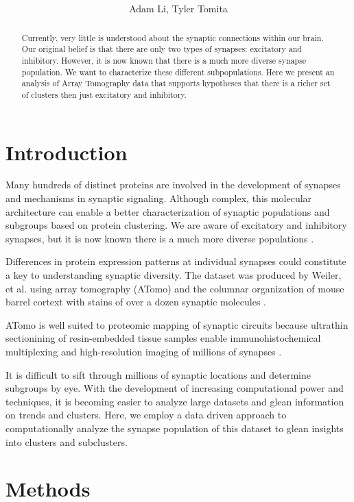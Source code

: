 \documentclass{article}
\title{\vspace{-50pt}
\db{Computational Analyses Supporting Diverse Synaptic Clusters}
}
\author{Adam Li, Tyler Tomita}
\begin{document}
\maketitle

\begin{abstract}
Currently, very little is understood about the synaptic connections within our brain. Our original belief is that there are only two types of synapses: excitatory and inhibitory. However, it is now known that there is a much more diverse synapse population. We want to characterize these different subpopulations. Here we present an analysis of Array Tomography data that supports hypotheses that there is a richer set of clusters then just excitatory and inhibitory. 
\end{abstract}

\section{Introduction}
Many hundreds of distinct proteins are involved in the development of synapses and mechanisms in synaptic signaling. Although complex, this molecular architecture can enable a better characterization of synaptic populations and subgroups based on protein clustering. We are aware of excitatory and inhibitory synapses, but it is now known there is a much more diverse populations \cite{Wheeler2015,Usoskin2014a}.

Differences in protein expression patterns at individual synapses could constitute a key to understanding synaptic diversity. The dataset was produced by Weiler, et al. using array tomography (ATomo) and the columnar organization of mouse barrel cortext with stains of over a dozen synaptic molecules \cite{Weiler2014}. 

ATomo is well suited to proteomic mapping of synaptic circuits because ultrathin sectionining of resin-embedded tissue samples enable immunohistochemical multiplexing and high-resolution imaging of millions of synapses \cite{Micheva2007}.

It is difficult to sift through millions of synaptic locations and determine subgroups by eye. With the development of increasing computational power and techniques, it is becoming easier to analyze large datasets and glean information on trends and clusters. Here, we employ a data driven approach to computationally analyze the synapse population of this dataset to glean insights into clusters and subclusters.

\section{Methods}
\end{document}
